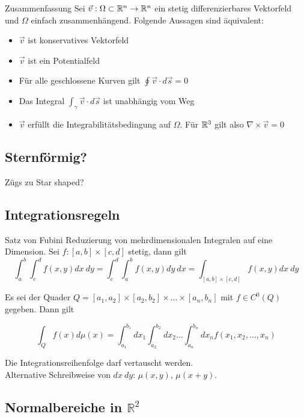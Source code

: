 \begin{Diverses}{Zusammenfassung}{}
	Sei $\vec{v} : \Omega \subset \mathbb{R}^n \to \mathbb{R}^n$ ein stetig differenzierbares Vektorfeld und $\Omega$ einfach zusammenhängend. Folgende Aussagen sind äquivalent:
	\begin{itemize}
		\item $\vec{v}$ ist konservatives Vektorfeld
		\item $\vec{v}$ ist ein Potentialfeld
		\item Für alle geschlossene Kurven gilt $\oint \vec{v} \cdot d\vec{s} = 0$
		\item Das Integral $\int_\gamma \vec{v} \cdot d\vec{s}$ ist unabhängig vom Weg
		\item $\vec{v}$ erfüllt die Integrabilitätsbedingung auf $\Omega$. Für $\mathbb{R}^3$ gilt also $\nabla \times \vec{v} = 0$
	\end{itemize}
\end{Diverses}
\subsection{Sternförmig?}
Zügs zu Star shaped?

\subsection{Integrationsregeln}

\begin{Satz}{Satz von Fubini}{}
    Reduzierung von mehrdimensionalen Integralen auf eine Dimension. Sei $f: [a,b] \times [c, d]$ stetig, dann gilt
    \[ \int_a^b \int_c^d f(x, y) dx ~ dy = \int_c^d \int_a^b f(x, y) dy ~ dx = \int_{[a,b] \times [c, d]} f(x, y) dx ~ dy   \]

    Es sei der Quader $Q = [a_1,a_2] \times [a_2, b_2] \times \dots \times [a_n, b_n]$ mit $f \in C^0(Q)$ gegeben. Dann gilt

    \[
        \int_Q f(x) d\mu(x) = \int_{a_1}^{b_1} dx_1 \int_{a_2}^{b_2} dx_2 \dots \int_{a_n}^{b_n} dx_n f(x_1, x_2,...,x_n)
    \]
\end{Satz}
Die Integrationsreihenfolge darf vertauscht werden.\\

Alternative Schreibweise von $dx ~ dy$: $\mu(x, y)$, $\mu(x+y)$.

\subsection{Normalbereiche in $\mathbb{R}^2$}

